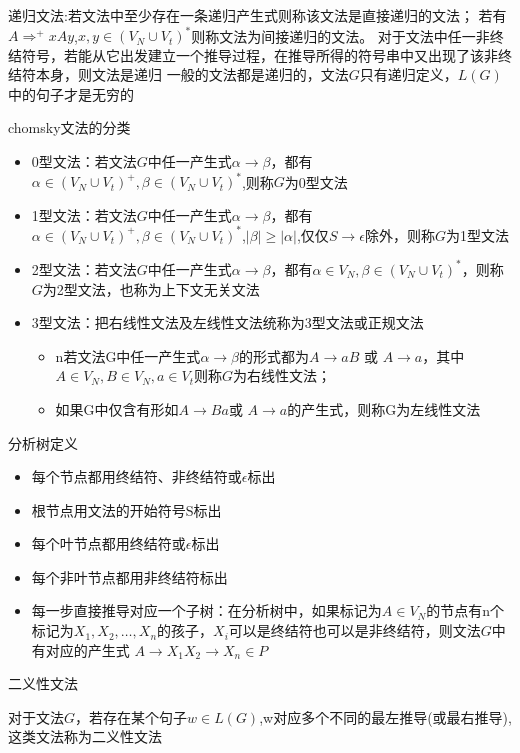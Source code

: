 \documentclass[utf8]{ctexart}
\begin{document}
递归文法:若文法中至少存在一条递归产生式则称该文法是直接递归的文法；
若有$A \Rightarrow ^+ xAy$,$x,y \in (V_N \cup V_t)^*$则称文法为间接递归的文法。
对于文法中任一非终结符号，若能从它出发建立一个推导过程，在推导所得的符号串中又出现了该非终结符本身，则文法是递归
一般的文法都是递归的，文法$G$只有递归定义，$L(G)$中的句子才是无穷的


\noindent chomsky文法的分类
\begin{itemize}
    \item 0型文法：若文法$G$中任一产生式$\alpha \rightarrow \beta$，都有$\alpha \in (V_N \cup V_t)^+, \beta \in (V_N \cup V_t)^*$,则称$G$为0型文法
    \item 1型文法：若文法$G$中任一产生式$\alpha \rightarrow \beta$，都有$\alpha \in (V_N \cup V_t)^+, \beta \in (V_N \cup V_t)^*$,$|\beta| \geq |\alpha|$,仅仅$S \rightarrow \epsilon$除外，则称$G$为1型文法
    \item 2型文法：若文法$G$中任一产生式$\alpha \rightarrow \beta$，都有$\alpha \in V_N, \beta \in (V_N \cup V_t)^* $，则称$G$为2型文法，也称为上下文无关文法
    \item 3型文法：把右线性文法及左线性文法统称为3型文法或正规文法
    \begin{itemize}
        \item n若文法G中任一产生式$\alpha \rightarrow \beta$的形式都为$A \rightarrow aB$ 或 $A \rightarrow a$，其中$A \in V_N, B \in V_N, a \in V_t$则称$G$为右线性文法；
        \item 如果G中仅含有形如$A \rightarrow Ba$或 $A \rightarrow a$的产生式，则称G为左线性文法
    \end{itemize}
\end{itemize}


\noindent 分析树定义
\begin{itemize}
    \item 每个节点都用终结符、非终结符或$\epsilon$标出
    \item 根节点用文法的开始符号S标出
    \item 每个叶节点都用终结符或$\epsilon$标出
    \item 每个非叶节点都用非终结符标出
    \item 每一步直接推导对应一个子树：在分析树中，如果标记为$A \in V_N$的节点有n个标记为$X_1,X_2, \dots,X_n$的孩子，$X_i$可以是终结符也可以是非终结符，则文法$G$中有对应的产生式 $A \rightarrow X_1X_2\rightarrow X_n \in P$
\end{itemize}

\noindent 二义性文法

对于文法$G$，若存在某个句子$w \in L(G)$,w对应多个不同的最左推导(或最右推导),这类文法称为二义性文法
\end{document}
